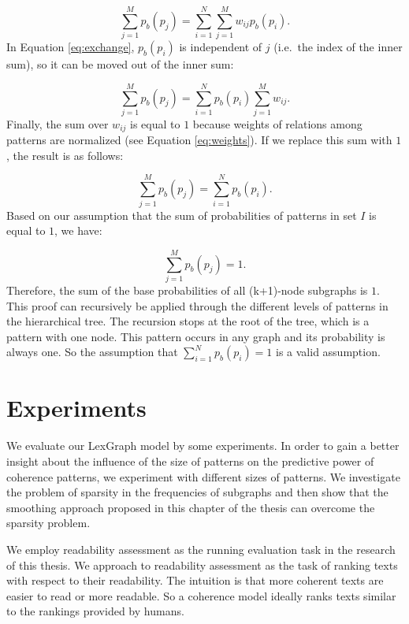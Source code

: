 \begin{equation}
\label{eq:exchange}
\sum_{j=1}^M p_b(p_j) = \sum_{i=1}^N \sum_{j=1}^M w_{ij}p_b(p_i).
\end{equation}
%
In Equation \ref{eq:exchange}, $p_b(p_i)$ is independent of $j$ (i.e.\ the index of the inner sum), so it can be moved out of the inner sum:

\begin{equation}
\sum_{j=1}^M p_b(p_j) = \sum_{i=1}^N p_b(p_i) \sum_{j=1}^M w_{ij}.
\end{equation}
%
Finally, the sum over $w_{ij}$ is equal to $1$ because weights of relations among patterns are normalized (see Equation \ref{eq:weights}).   
If we replace this sum with $1$, the result is as follows:

\begin{equation}
\sum_{j=1}^M p_b(p_j) = \sum_{i=1}^N p_b(p_i).
\end{equation}
%
Based on our assumption that the sum of probabilities of patterns in set $I$ is equal to $1$, we have: 

\begin{equation}
\sum_{j=1}^M p_b(p_j) = 1.
\end{equation}
%
Therefore, the sum of the base probabilities of all (k+1)-node subgraphs is $1$. 
This proof can recursively be applied through the different levels of patterns in the hierarchical tree. 
The recursion stops at the root of the tree, which is a pattern with one node. 
This pattern occurs in any graph and its probability is always one. 
So the assumption that $\sum_{i=1}^N p_b(p_i) = 1$ is a valid assumption. 
\QEDB

\section{Experiments}
\label{sec:lex-graph-results}

We evaluate our LexGraph model by some experiments.  
In order to gain a better insight about the influence of the size of patterns on the predictive power of coherence patterns, we experiment with different sizes of patterns. 
We investigate the problem of sparsity in the frequencies of subgraphs and then show that the smoothing approach proposed in this chapter of the thesis can overcome the sparsity problem. 

We employ readability assessment as the running evaluation task in the research of this thesis.
We approach to readability assessment as the task of ranking texts with respect to their readability. 
The intuition is that more coherent texts are easier to
read or more readable. 
So a coherence model ideally ranks texts similar to the rankings provided by humans.  

